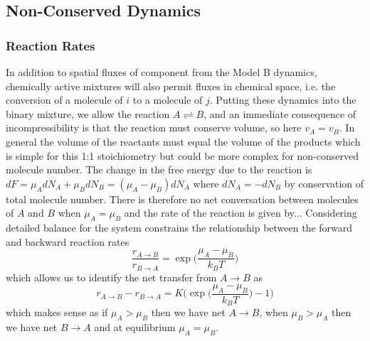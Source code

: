 \subsection{Non-Conserved Dynamics}

\subsubsection{Reaction Rates}
In addition to spatial fluxes of component from the Model B dynamics, chemically active mixtures will also permit fluxes in chemical space, i.e. the conversion of a molecule of $i$ to a molecule of $j$. Putting these dynamics into the binary mixture, we allow the reaction $A \rightleftharpoons B$, and an immediate consequence of incompressibility is that the reaction must conserve volume, so here $v_A = v_B$. In general the volume of the reactants must equal the volume of the products which is simple for this 1:1 stoichiometry but could be more complex for non-conserved molecule number. The change in the free energy due to the reaction is $dF = \mu_A dN_A+\mu_B dN_B = (\mu_A - \mu_B)dN_A$ where $dN_A = -dN_B$ by conservation of total molecule number. There is therefore no net conversation between molecules of $A$ and $B$ when $\mu_A = \mu_B$ and  the rate of the reaction is given by... Considering detailed balance for the system constrains the relationship between the forward and backward reaction rates
\begin{equation}
    \frac{r_{A \rightarrow B}}{r_{B \rightarrow A}} = \exp\Bigg(\frac{\mu_A - \mu_B}{k_B T}\Bigg)
    \label{db_constr}
\end{equation}
which allows us to identify the net transfer from $A \rightarrow B$ as
\begin{equation}
    r_{A \rightarrow B} - r_{B \rightarrow A} = K\Bigg(\exp\bigg(\frac{\mu_A - \mu_B}{k_B T}\bigg)-1\Bigg)
    \label{eq:sponrate}
\end{equation}
which makes sense as if $\mu_A > \mu_B$ then we have net $A \rightarrow B$, when $\mu_B > \mu_A$ then we have net $B \rightarrow A$ and at equilibrium $\mu_A = \mu_B$\cite{weber2019physics}.


